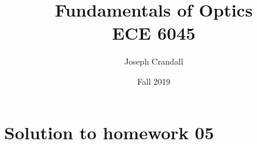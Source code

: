

\usepackage{subfiles}
\usepackage{color,soul}
\usepackage{siunitx}
\usepackage{gensymb}

\title{Fundamentals of Optics\\
\large ECE 6045}
\author{Joseph Crandall}
\date{Fall 2019}


\maketitle

%

%

%

%

%

\section{Solution to homework 05}


%


